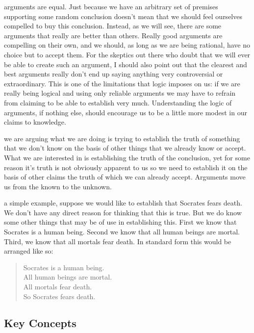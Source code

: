 \documentclass[justified]{tufte-book}
\newenvironment{argument}{\begin{quote}\normalsize}{\end{quote}}
\begin{document}
 arguments are equal. Just because we have an arbitrary set of premises supporting some random conclusion doesn't mean that we should feel ourselves compelled to buy this conclusion. Instead, as we will see, there are some arguments that really are better than others. Really good arguments are compelling on their own, and we should, as long as we are being rational, have no choice but to accept them. For the skeptics out there who doubt that we will ever be able to create such an argument, I should also point out that the clearest and best arguments really don't end up saying anything very controversial or extraordinary. This is one of the limitations that logic imposes on us: if we are really being logical and using only reliable arguments we may have to refrain from claiming to be able to establish very much. Understanding the logic of arguments, if nothing else, should encourage us to be a little more modest in our claims to knowledge.

 we are arguing what we are doing is trying to establish the truth of something that we don't know on the basis of other things that we already know or accept. What we are interested in is establishing the truth of the conclusion, yet for some reason it's truth is not obviously apparent to us so we need to establish it on the basis of other claims the truth of which we can already accept. Arguments move us from the known to the unknown.

 a simple example, suppose we would like to establish that Socrates fears death. We don't have any direct reason for thinking that this is true. But we do know some other things that may be of use in establishing this. First we know that Socrates is a human being. Second we know that all human beings are mortal. Third, we know that all mortals fear death. In standard form this would be arranged like so:

\begin{argument}
Socrates is a human being.\\
All human beings are mortal.\\
All mortals fear death.\\

So Socrates fears death.
\end{argument}

\hypertarget{key-concepts}{%
\subsection*{Key Concepts}\label{key-concepts}}
\end{document}

